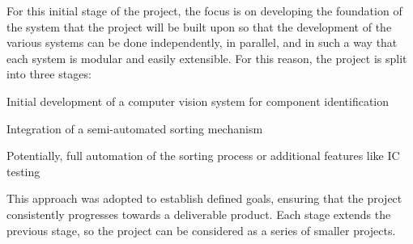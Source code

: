 \noindent
For this initial stage of the project, the focus is on developing the foundation of the system that the project
will be built upon so that the development of the various systems can be done independently, in parallel, and in such a way that each system
is modular and easily extensible. For this reason, the project is split into three stages:
\begin{mylist}
  \item Initial development of a computer vision system for component identification
  \item Integration of a semi-automated sorting mechanism
  \item Potentially, full automation of the sorting process or additional features like IC testing
\end{mylist}
This approach was adopted to establish defined goals, ensuring that the project consistently progresses towards a deliverable product. 
Each stage extends the previous stage, so the project can be considered as a series of smaller projects. 
